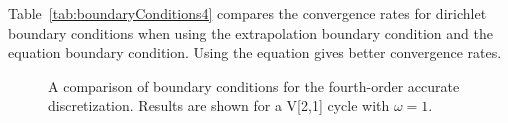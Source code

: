 Table~\ref{tab:boundaryConditions4} compares the convergence rates for dirichlet boundary conditions
when using the extrapolation
boundary condition and the equation boundary condition. Using the equation gives better convergence
rates. 


{
\renewcommand{\figWidth}{7.cm}
\newcommand{\trimfig}[2]{\trimhb{#1}{#2}{.0}{.0}{.0}{.0}}
\begin{figure}[hbt]
\begin{center}
\end{center}
\caption{A comparison of boundary conditions for the fourth-order accurate discretization.
Results are shown for a V[2,1] cycle with $\omega=1$.}
\label{fig:fourthOrderBC}
\end{figure}
}



